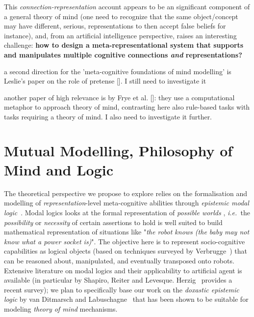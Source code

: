 \documentclass{sig-alternate}
\newcommand{\ie}{{\textit{i.e.~}}}
\begin{document}
This \emph{connection-representation} account appears to be an significant
component of a general theory of mind (one need to recognize that the same
object/concept may have different, serious, representations to then accept false
beliefs for instance), and, from an artificial intelligence perspective, raises
an interesting challenge: \textbf{how to design a meta-representational system
that supports and manipulates multiple cognitive connections \emph{and}
representations?} 

a second direction for the 'meta-cognitive foundations of mind modelling' is
Leslie's paper on the role of pretense []. I still need to investigate it

another paper of high relevance is by Frye et al. []: they use a computational
metaphor to approach theory of mind, contrasting here also
rule-based tasks with tasks requiring a theory of mind. I also need to
investigate it further.

\section{Mutual Modelling, Philosophy of Mind and Logic}


The theoretical perspective we propose to explore relies on the formalisation
and modelling of \emph{representation}-level meta-cognitive abilities through
\emph{epistemic modal logic}~\cite{hendricks2008epistemic}. Modal logics looks
at the formal representation of \emph{possible worlds} , \ie the
\emph{possibility} or \emph{necessity} of certain assertions to hold  is well
suited to build mathematical representation of situations like "\emph{the robot
knows (the baby may not know what a power socket is)}". The objective here is to
represent socio-cognitive capabilities as logical objects (based on techniques
surveyed by Verbrugge~\cite{verbrugge2009logic}) that can be reasoned about,
manipulated, and eventually transposed onto robots. Extensive literature on
modal logics and their applicability to artificial agent is available (in
particular by Shapiro, Reiter and Levesque.  Herzig~\cite{herzig2014logics}
provides a recent survey); we plan to specifically base our work on the
\emph{doxastic epistemic logic} by van Ditmarsch and
Labuschagne~\cite{vanditmarsch2007beliefs} that has been shown to be suitable
for modeling \emph{theory of mind} mechanisms.

\end{document}
